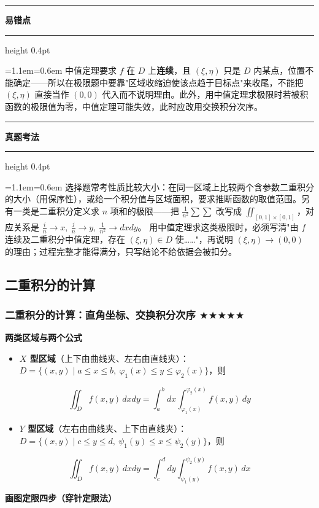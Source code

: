 \documentclass[11pt,openany,UTF8]{ctexbook}
\newcommand{\callouthead}[2]{%
  \par\addvspace{7pt}\noindent
  {\color{#1}\rule[-0.15em]{3pt}{1.05em}}\hspace{0.5em}%
  {\bfseries\color{#1}#2}\par\nobreak\vspace{-0.35em}%
  {\color{rulesep}\hrule height 0.4pt}\nobreak\vspace{0.45em}%
  \begingroup\small\setlength{\parindent}{0pt}%
  \leftskip=1.1em\rightskip=0.6em\noindent\ignorespaces}
\newcommand{\calloutend}{\par\endgroup\addvspace{7pt}}
\newenvironment{callwarn}[1]{\callouthead{warnbar}{#1}}{\calloutend}
\newenvironment{callexam}[1]{\callouthead{exambar}{#1}}{\calloutend}
\begin{document}
\begin{callwarn}{易错点}
中值定理要求 $f$ 在 $D$ 上\textbf{连续}，且 $(\xi,\eta)$ 只是 $D$ 内某点，位置不能确定——所以在极限题中要靠"区域收缩迫使该点趋于目标点"来收尾，不能把 $(\xi,\eta)$ 直接当作 $(0,0)$ 代入而不说明理由。此外，用中值定理求极限时若被积函数的极限值为零，中值定理可能失效，此时应改用交换积分次序。

\end{callwarn}

\begin{callexam}{真题考法}
选择题常考性质比较大小：在同一区域上比较两个含参数二重积分的大小（用保序性），或给一个积分值与区域面积，要求推断函数的取值范围。另有一类是二重积分定义求 $n$ 项和的极限——把 $\frac{1}{n^{2}}\sum\sum$ 改写成 $\iint_{[0,1]\times[0,1]}$，对应关系是 $\frac in\to x,\ \frac jn\to y,\ \frac{1}{n^{2}}\to dxdy$。 用中值定理求这类极限时，必须写清"由 $f$ 连续及二重积分中值定理，存在 $(\xi,\eta)\in D$ 使……"，再说明 $(\xi,\eta)\to(0,0)$ 的理由；过程完整才能得满分，只写结论不给依据会被扣分。

\end{callexam}

\subsection{二重积分的计算}

\subsubsection{二重积分的计算：直角坐标、交换积分次序 $\bigstar$$\bigstar$$\bigstar$$\bigstar$$\bigstar$}

\textbf{两类区域与两个公式}

\begin{itemize}
\item \textbf{$X$ 型区域}（上下由曲线夹、左右由直线夹）：$D=\{(x,y)\mid a\le x\le b,\ \varphi_1(x)\le y\le \varphi_2(x)\}$，则
\end{itemize}
\[\iint_{D}f(x,y)\,dxdy=\int_{a}^{b}dx\int_{\varphi_1(x)}^{\varphi_2(x)}f(x,y)\,dy\]

\begin{itemize}
\item \textbf{$Y$ 型区域}（左右由曲线夹、上下由直线夹）：$D=\{(x,y)\mid c\le y\le d,\ \psi_1(y)\le x\le \psi_2(y)\}$，则
\end{itemize}
\[\iint_{D}f(x,y)\,dxdy=\int_{c}^{d}dy\int_{\psi_1(y)}^{\psi_2(y)}f(x,y)\,dx\]

\textbf{画图定限四步（穿针定限法）}
\end{document}
